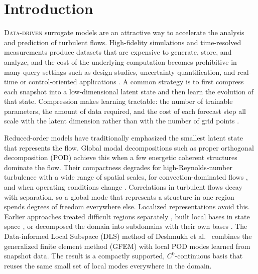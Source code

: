 \documentclass[conf]{new-aiaa}
\begin{document}
\section{Introduction}
\lettrine{D}{ata-driven} surrogate models are an attractive way to accelerate the analysis and prediction of turbulent flows. High-fidelity simulations and time-resolved measurements produce datasets that are expensive to generate, store, and analyze, and the cost of the underlying computation becomes prohibitive in many-query settings such as design studies, uncertainty quantification, and real-time or control-oriented applications \cite{benner2015survey}. A common strategy is to first compress each snapshot into a low-dimensional latent state and then learn the evolution of that state. Compression makes learning tractable: the number of trainable parameters, the amount of data required, and the cost of each forecast step all scale with the latent dimension rather than with the number of grid points \cite{brunton2020ml,vinuesa2022enhancing,brunton2024promising}.

Reduced-order models have traditionally emphasized the smallest latent state that represents the flow. Global modal decompositions such as proper orthogonal decomposition (POD) \cite{sirovich1987,berkooz1993,holmes2012turbulence,taira2017modal,taira2020modal} achieve this when a few energetic coherent structures dominate the flow. Their compactness degrades for high-Reynolds-number turbulence with a wide range of spatial scales, for convection-dominated flows \cite{mojgani2017lagrangian}, and when operating conditions change \cite{deshmukh2016sparse}. Correlations in turbulent flows decay with separation, so a global mode that represents a structure in one region spends degrees of freedom everywhere else. Localized representations avoid this. Earlier approaches treated difficult regions separately \cite{lucia2001thesis}, built local bases in state space \cite{amsallem2012local}, or decomposed the domain into subdomains with their own bases \cite{hoang2021ddlspg,diaz2024ddnm}. The Data-informed Local Subspace (DLS) method of Deshmukh et al.~\cite{deshmukh2020dls} combines the generalized finite element method (GFEM) \cite{melenk1996pum,babuska2004gfem} with local POD modes learned from snapshot data. The result is a compactly supported, $C^0$-continuous basis that reuses the same small set of local modes everywhere in the domain.
\end{document}
